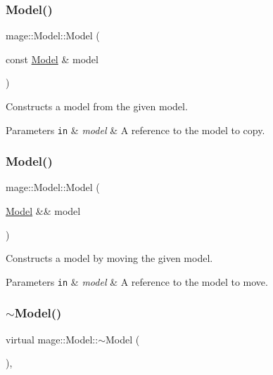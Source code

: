 \subsubsection{\texorpdfstring{Model()}{Model()}\hspace{0.1cm}{\footnotesize\ttfamily [2/3]}}
{\footnotesize\ttfamily mage\+::\+Model\+::\+Model (\begin{DoxyParamCaption}\item[{const \hyperlink{classmage_1_1_model}{Model} \&}]{model }\end{DoxyParamCaption})}

Constructs a model from the given model.


\begin{DoxyParams}[1]{Parameters}
\mbox{\tt in}  & {\em model} & A reference to the model to copy. \\
\hline
\end{DoxyParams}
\hypertarget{classmage_1_1_model_a085272d7cb82587094f18747ecc5aad0}{}\label{classmage_1_1_model_a085272d7cb82587094f18747ecc5aad0} 
\subsubsection{\texorpdfstring{Model()}{Model()}\hspace{0.1cm}{\footnotesize\ttfamily [3/3]}}
{\footnotesize\ttfamily mage\+::\+Model\+::\+Model (\begin{DoxyParamCaption}\item[{\hyperlink{classmage_1_1_model}{Model} \&\&}]{model }\end{DoxyParamCaption})\hspace{0.3cm}{\ttfamily [default]}}

Constructs a model by moving the given model.


\begin{DoxyParams}[1]{Parameters}
\mbox{\tt in}  & {\em model} & A reference to the model to move. \\
\hline
\end{DoxyParams}
\hypertarget{classmage_1_1_model_a802f7bcb3d15d3baab4a8d383d9e9293}{}\label{classmage_1_1_model_a802f7bcb3d15d3baab4a8d383d9e9293} 
\subsubsection{\texorpdfstring{$\sim$\+Model()}{~Model()}}
{\footnotesize\ttfamily virtual mage\+::\+Model\+::$\sim$\+Model (\begin{DoxyParamCaption}{ }\end{DoxyParamCaption})\hspace{0.3cm}{\ttfamily [virtual]}, {\ttfamily [default]}}

